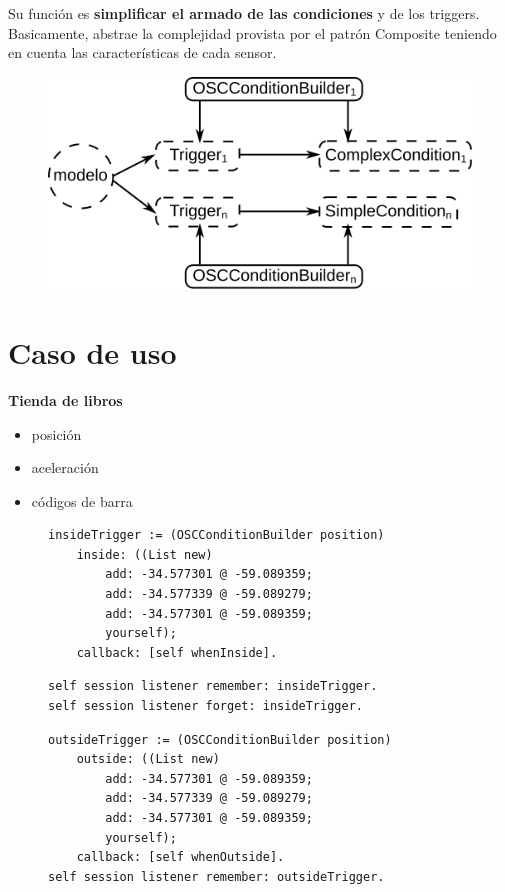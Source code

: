 \documentclass[
paper=128mm:96mm, %
fontsize=11pt, %
pagesize, %
parskip=half-, %
]{scrartcl} %
\theoremstyle{mythmstyle} %
\begin{document}
Su función es \textbf{simplificar el armado de las condiciones} y de los triggers. Basicamente, abstrae la complejidad provista por el patrón Composite teniendo en cuenta las características de cada sensor.

\begin{figure}[ht!]
\centering\includegraphics[width=0.7\linewidth]{Figures/DesignPatternBuilder}
\end{figure}

\clearpage


\section{Caso de uso}

\textbf{Tienda de libros}
\begin{itemize}
\item posición
\item aceleración
\item códigos de barra
\end{itemize}

\clearpage

\begin{figure}[ht!]
\centering
\begin{verbatim}
insideTrigger := (OSCConditionBuilder position)
    inside: ((List new)
        add: -34.577301 @ -59.089359;
        add: -34.577339 @ -59.089279;
        add: -34.577301 @ -59.089359;
        yourself);
    callback: [self whenInside].
\end{verbatim}

\begin{verbatim}
self session listener remember: insideTrigger.
self session listener forget: insideTrigger.
\end{verbatim}
\end{figure}

\clearpage

\begin{figure}[ht!]
\centering
\begin{verbatim}
outsideTrigger := (OSCConditionBuilder position)
    outside: ((List new)
        add: -34.577301 @ -59.089359;
        add: -34.577339 @ -59.089279;
        add: -34.577301 @ -59.089359;
        yourself);
    callback: [self whenOutside].
self session listener remember: outsideTrigger.
\end{verbatim}
\end{figure}
\end{document}
